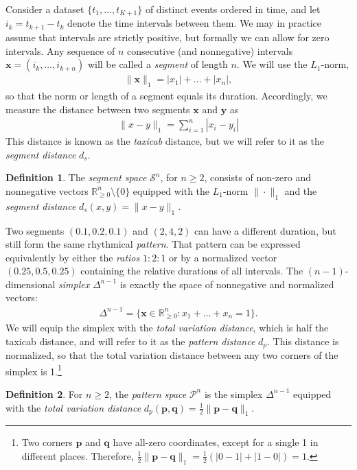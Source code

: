 \documentclass[a4paper]{article}
\newcommand{\RR}{\mathbb{R}}
\newcommand{\vect}[1]{\mathbf{#1}}
\newcommand{\vx}{\vect x}
\newcommand{\vy}{\vect y}
\newcommand{\vp}{\vect p}
\newcommand{\vq}{\vect q}
\theoremstyle{definition}
\newtheorem{definition}{Definition}
\begin{document}
Consider a dataset $\{t_1, \dots, t_{K+1}\}$ of distinct events ordered in time, and let $i_k = t_{k+1}-t_k$ denote the time intervals between them.
We may in practice assume that intervals are strictly positive, but formally we can allow for zero intervals.
Any sequence of $n$ consecutive (and nonnegative) intervals $\vx = (i_k, \dots, i_{k+n})$ will be called a \emph{segment} of length $n$.
We will use the $L_1$-norm,
\begin{align}
  \|\vx\|_1 = |x_1| + \dots + |x_n|,
\end{align}
so that the norm or length of a segment equals its duration.
Accordingly, we measure the distance between two segments $\vx$ and $\vy$ as
\begin{align}
  \|x-y\|_1 = \sum_{i=1}^n |x_i-y_i|
\end{align}
This distance is known as the \emph{taxicab} distance, but we will refer to it as the \emph{segment distance} $d_s$.


\begin{definition}
  The \emph{segment space} $\mathcal{S}^n$, for $n\ge 2$, consists of non-zero and nonnegative vectors $\RR_{\ge 0}^n \setminus \{0\}$ equipped with the $L_1$-norm $\|\cdot\|_1$ and the \emph{segment distance} $d_s(x, y) = \|x-y\|_1$.
\end{definition}


Two segments $(0.1, 0.2, 0.1)$ and $(2, 4, 2)$ can have a different duration, but still form the same rhythmical \emph{pattern}.
That pattern can be expressed equivalently by either the \emph{ratios} $1 : 2 : 1$ or by a normalized vector $(0.25, 0.5, 0.25)$ containing the relative durations of all intervals.
The $(n-1)$-dimensional \emph{simplex} $\Delta^{n-1}$ is exactly the space of nonnegative and normalized vectors:
\begin{align}
  \Delta^{n-1}
  = \{ \vx \in \RR_{\ge 0}^n: x_1 + \dots + x_n = 1\}.
\end{align}
We will equip the simplex with the \emph{total variation distance}, which is half the taxicab distance, and will refer to it as the \emph{pattern distance} $d_p$.
This distance is normalized, so that the total variation distance between any two corners of the simplex is 1.\footnote{%
  Two corners $\vp$ and $\vq$ have all-zero coordinates, except for a single 1 in different places. Therefore, $\tfrac{1}{2}\|\vp-\vq\|_1 = \tfrac{1}{2} (|0-1| + |1 - 0|) = 1$.
}

\begin{definition} For $n\ge 2$, the \emph{pattern space} $\mathcal{P}^n$ is the simplex $\Delta^{n-1}$ equipped with the \emph{total variation distance} $d_p(\vp, \vq) = \tfrac{1}{2}\|\vp - \vq\|_1$.
\end{definition}
\end{document}

